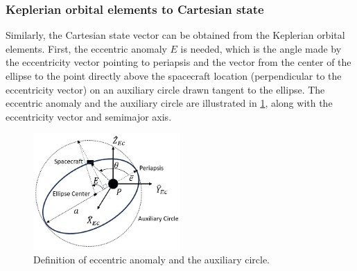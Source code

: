 \subsubsection{Keplerian orbital elements to Cartesian state}
Similarly, the Cartesian state vector can be obtained from the Keplerian orbital elements. First,
the eccentric anomaly $E$ is needed, which is the angle made by the eccentricity vector pointing to
periapsis and the vector from the center of the ellipse to the point directly above the spacecraft
location (perpendicular to the eccentricity vector) on an auxiliary circle drawn tangent to the
ellipse. The eccentric anomaly and the auxiliary circle are illustrated in \cref{fig:auxCircle}, along
with the eccentricity vector and semimajor axis.

\begin{figure}[H]
    \centering
    \includegraphics[width=0.5\textwidth]{figures/AuxCircle.jpg}
    \caption{Definition of eccentric anomaly and the auxiliary circle.}
    \label{fig:auxCircle}
\end{figure}

